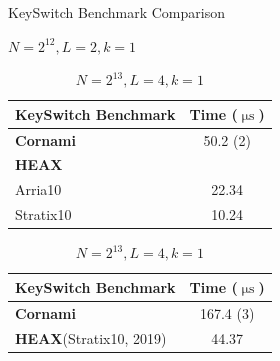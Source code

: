 \documentclass{article}
\DeclareMathOperator*{\us}{\mu\mathrm{s}}
\begin{document}
	\begin{table}[H]
		\centering
		\renewcommand{\arraystretch}{1.5}
		\caption{KeySwitch Benchmark Comparison}
		
		\begin{subtable}[b]{0.45\textwidth}
			\centering
			\caption{$N=2^{12}, L=2, k=1$}
			\begin{tabular}{ | w{l}{4.0cm} | S[table-format=2.2] | }
				\hline
				\textbf{KeySwitch Benchmark} & {Time ($\us$)} \\
				\hline
				\textbf{Cornami} & {50.2 (2)} \\
				\hline
				\textbf{HEAX} & \\
				\hfill Arria10 & 22.34 \\
				\hfill Stratix10 & 10.24 \\
				\hline
			\end{tabular}
		\end{subtable}
		\hfill %
		\begin{subtable}[b]{0.45\textwidth}
			\centering
			\caption{$N=2^{13}, L=4, k=1$}
			\begin{tabular}{ | w{l}{4.0cm} | S[table-format=2.2] | }
				\hline
				\textbf{KeySwitch Benchmark} & {Time ($\us$)} \\
				\hline
				\textbf{Cornami} & {167.4 (3)} \\
				\hline
				\textbf{HEAX}\hfill(Stratix10, 2019) & 44.37 \\
				\hline
			\end{tabular}
		\end{subtable}
		
		\vspace{1.5em}
		

\end{table}
\end{document}
